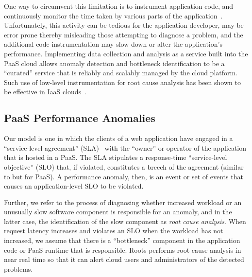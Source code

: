 One way to circumvent this 
limitation is to instrument application code, and continuously monitor the time taken by various
parts of the application~\cite{newrelic,datadog,dynatrace}. 
Unfortunately, this activity can be tedious for the application developer, 
may be error prone thereby misleading those attempting to
diagnose a problem, and
the additional code instrumentation may slow down or alter the application's
performance. 
Implementing data collection and analysis as a service built into the PaaS cloud allows 
anomaly detection and bottleneck identification to be a ``curated'' service that is 
reliably and scalably managed by the cloud platform. Such use of low-level instrumentation
for root cause analysis has been shown to be effective in IaaS clouds~\cite{Dean:2014:PTR:2696535.2696551}.

\subsection{PaaS Performance Anomalies}


Our model is
one in which the clients of a web application have engaged in a
``service-level agreement'' (SLA)~\cite{Keller:2003:WFS:635430.635442}
with the ``owner'' or operator of the application that is hosted in a PaaS.  The SLA
stipulates a response-time ``service-level objective'' (SLO) that, if violated, constitutes a breech of the
agreement (similar to \cite{Nguyen:2011:PPR:2038633.2038634} but for PaaS).  
A performance anomaly, then, is an event or set of events that
causes an application-level SLO to be violated.

Further, we refer to the process
of diagnosing whether increased workload or an unusually slow software component is responsible for
an anomaly, and in the latter case, the identification of the slow component
as \textit{root cause analysis}.  When request latency increases and violates an SLO when
the workload has not increased, we assume that there is a ``bottleneck''
component in the application code or PaaS runtime that is responsible.  Roots
performs root cause analysis in near real time so
that it can alert cloud users and administrators of the detected problems.

